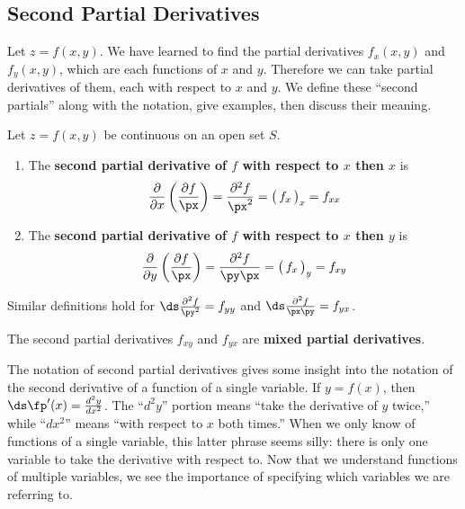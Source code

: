 \subsection*{Second Partial Derivatives}

Let $z=f(x,y)$. We have learned to find the partial derivatives $f_x(x,y)$ and $f_y(x,y)$, which are each functions of $x$ and $y$. Therefore we can take partial derivatives of them, each with respect to $x$ and $y$. We define these ``second partials'' along with the notation, give examples, then discuss their meaning.

{Let $z=f(x,y)$ be continuous on an open set $S$.
\begin{enumerate}
	\item The \textbf{second partial derivative of $f$ with respect to $x$ then $x$} is $$\frac{\partial}{\partial x}\left(\frac{\partial f}{\px}\right) = \frac{\partial^2 f}{\px^2} = \big(\,f_x\,\big)_x = f_{xx}$$

\item The \textbf{second partial derivative of $f$ with respect to $x$ then $y$} is $$\frac{\partial}{\partial y}\left(\frac{\partial f}{\px}\right) = \frac{\partial^2f}{\py\px} = \big(\,f_x\,\big)_y = f_{xy}$$

%

\end{enumerate}

Similar definitions hold for $\ds \frac{\partial^2f}{\py^2} = f_{yy}$ and $\ds \frac{\partial^2f}{\px\py} = f_{yx}$. \bigskip

The second partial derivatives $f_{xy}$ and $f_{yx}$ are \textbf{mixed partial derivatives}.
}

The notation of second partial derivatives gives some insight into the notation of the second derivative of a function of a single variable. If $y=f(x)$, then $\ds \fp'(x) = \frac{d^2 y}{dx^2}$. The ``$d^2y$'' portion means ``take the derivative of $y$ twice,'' while ``$dx^2$'' means ``with respect to $x$ both times.'' When we only know of functions of a single variable, this latter phrase seems silly: there is only one variable to take the derivative with respect to. Now that we understand functions of multiple variables, we see the importance of specifying which variables we are referring to.

